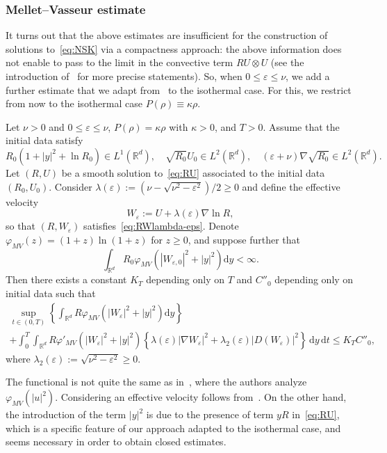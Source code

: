 \documentclass[AHL,Unicode,longabstracts]{cedram}
\newcommand*\R{\mathbb{R}}
\newcommand*\dd {\mathrm{d}}
\newcommand*\<{\left\langle}
\renewcommand*\>{\right\rangle}
\renewcommand*\le{\leqslant}
\renewcommand*\ge{\geqslant}
\newcommand*\eps{\varepsilon}
\begin{document}
\subsubsection{Mellet--Vasseur estimate}\label{sec:mellet-vasseur}

It turns out that the above estimates are insufficient for the construction of solutions to~\eqref{eq:NSK} via a compactness approach: the above information does not enable to pass to the limit in the convective term $R U \otimes U$ (see the introduction of~\cite{VasseurYuInventiones} for more precise statements). So, when $0 \le \varepsilon \le \nu$, we add a further estimate that we adapt from~\cite{MelletVasseur,AS-comp} to the isothermal case. For this, we restrict from now to the isothermal case $P(\rho)\equiv \kappa \rho.$

\begin{prop}\label{prop:inegaliteMV}
Let $\nu >0$ and $0 \le \varepsilon \le \nu$, $P(\rho) = \kappa \rho$ with $\kappa >0$, and $T>0$. Assume that the initial data satisfy
\[
R_0(1+|y|^2 + \ln R_0) \in L^1 (\R^d), \quad
\sqrt{R_0} U_0 \in L^2(\R^d), \quad (\eps+\nu) \nabla \sqrt{R_0} \in L^2(\R^d).
\]
Let $(R,U)$ be a smooth solution to~\eqref{eq:RU} associated to the initial data $(R_0,U_0)$. Consider $\lambda(\eps) := (\nu - \sqrt{\nu^2 -
\eps^2})/2 \ge 0$ and define the effective velocity
\[
W_\eps := U + \lambda(\eps) \nabla \ln R,
\]
so that $(R,W_\eps)$ satisfies~\eqref{eq:RWlambda-eps}. Denote $\varphi_{MV}(z) = (1+z)\ln(1+z)$ for $z \ge 0$, and suppose further that
\[
\int_{\R^d} R_0 \varphi_{MV}\left(|W_{\eps,0}|^2 + |y|^2\right) \dd y < \infty.
\]
Then there exists a constant $K_T$ depending only on $T$ and $C''_0$ depending only on initial data such that
\begin{multline*}
\sup_{t \in (0,T)} \left\{ \int_{\R^d} R \varphi_{MV}\left(|W_\eps|^2 + |y|^2\right) \dd y\right\} \\
+ \int_{0}^T \int_{\R^d} R \varphi'_{MV}\left(|W_\eps|^2+ |y|^2\right) \left\{ \lambda(\eps) |\nabla W_\eps|^2 + \lambda_2(\eps)|D(W_\eps)|^2 \right\} \, \dd y \, \dd t
\le K_T C''_0,
\end{multline*}
where $\lambda_2(\eps) := \sqrt{\nu^2 - \eps^2} \ge 0$.
\end{prop}

\begin{rema}
The functional is not quite the same as in~\cite{MelletVasseur}, where the authors analyze $\varphi_{MV}(|u|^2)$. Considering an effective velocity follows from~\cite{AS-comp}. On the other hand, the introduction of the term $|y|^2$ is due to the presence of term $yR$ in~\eqref{eq:RU}, which is a specific feature of our approach adapted to the isothermal case, and seems necessary in order to obtain closed estimates.
\end{rema}
\end{document}
